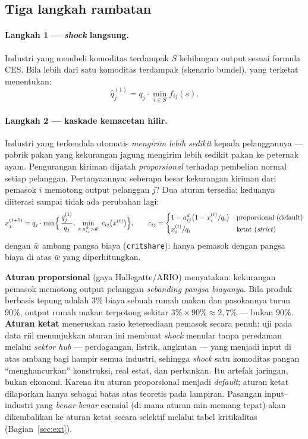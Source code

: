 \documentclass[11pt,a4paper]{article}
\newcommand{\en}[1]{\textit{#1}}   %
\begin{document}
\subsection{Tiga langkah rambatan}
\label{sec:cascade}

\paragraph{Langkah 1 --- \en{shock} langsung.} Industri yang membeli
komoditas terdampak $S$ kehilangan output sesuai formula CES. Bila lebih
dari satu komoditas terdampak (skenario bundel), yang terketat menentukan:
\begin{equation}
\hat{q}^{(1)}_j = q_j \cdot \min_{i \in S} f_{ij}(s).
\end{equation}

\paragraph{Langkah 2 --- kaskade kemacetan hilir.} Industri yang
terkendala otomatis \emph{mengirim lebih sedikit} kepada pelanggannya ---
pabrik pakan yang kekurangan jagung mengirim lebih sedikit pakan ke
peternak ayam. Pengurangan kiriman dijatah \emph{proporsional} terhadap
pembelian normal setiap pelanggan. Pertanyaannya: seberapa besar
kekurangan kiriman dari pemasok $i$ memotong output pelanggan $j$?
Dua aturan tersedia; keduanya diiterasi sampai tidak ada perubahan lagi:
\begin{equation}
x^{(t+1)}_j = q_j \cdot
\min\Bigl\{\, \frac{\hat q^{(1)}_j}{q_j},\;
\min_{i:\, a^d_{ij} > \bar w} \; c_{ij}\bigl(x^{(t)}\bigr) \Bigr\},
\qquad
c_{ij} =
\begin{cases}
1 - a^d_{ij}\bigl(1 - x^{(t)}_i/q_i\bigr) & \text{proporsional (default)}\\[2pt]
x^{(t)}_i / q_i & \text{ketat (\en{strict})}
\end{cases}
\label{eq:cascade}
\end{equation}
dengan $\bar w$ ambang pangsa biaya (\texttt{critshare}): hanya pemasok
dengan pangsa biaya di atas $\bar w$ yang diperhitungkan.

\textbf{Aturan proporsional} (gaya Hallegatte/ARIO) menyatakan: kekurangan
pemasok memotong output pelanggan \emph{sebanding pangsa biayanya}. Bila
produk berbasis tepung adalah 3\% biaya sebuah rumah makan dan pasokannya
turun 90\%, output rumah makan terpotong sekitar
$3\% \times 90\% \approx 2{,}7\%$ --- bukan 90\%. \textbf{Aturan ketat}
meneruskan rasio ketersediaan pemasok secara penuh; uji pada data riil
menunjukkan aturan ini membuat \en{shock} menular tanpa peredaman melalui
\emph{sektor hub} --- perdagangan, listrik, angkutan --- yang menjadi
input di atas ambang bagi hampir semua industri, sehingga \en{shock} satu
komoditas pangan ``menghancurkan'' konstruksi, real estat, dan perbankan.
Itu artefak jaringan, bukan ekonomi. Karena itu aturan proporsional
menjadi \emph{default}; aturan ketat dilaporkan hanya sebagai batas atas
teoretis pada lampiran. Pasangan input--industri yang \emph{benar-benar}
esensial (di mana aturan min memang tepat) akan dikembalikan ke aturan
ketat secara selektif melalui tabel kritikalitas
(Bagian~\ref{sec:ext}).
\end{document}
